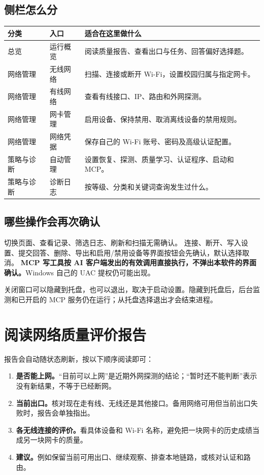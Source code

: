 \documentclass[UTF8,fontset=fandol,11pt,a4paper]{ctexart}
\begin{document}
\subsection{侧栏怎么分}
\begin{tabularx}{\linewidth}{@{}p{23mm}p{29mm}X@{}}
\toprule
分类 & 入口 & 适合在这里做什么\\
\midrule
总览 & 运行概览 & 阅读质量报告、查看出口与任务、回答偏好选择题。\\
网络管理 & 无线网络 & 扫描、连接或断开 Wi-Fi，设置校园归属与指定网卡。\\
网络管理 & 有线网络 & 查看有线接口、IP、路由和外网探测。\\
网络管理 & 网卡管理 & 启用设备、保持禁用、取消离线设备的禁用规则。\\
网络管理 & 网络凭据 & 保存自己的 Wi-Fi 账号、密码及高级认证配置。\\
策略与诊断 & 自动管理 & 设置恢复、探测、质量学习、认证程序、启动和 MCP。\\
策略与诊断 & 诊断日志 & 按等级、分类和关键词查询发生过什么。\\
\bottomrule
\end{tabularx}

\subsection{哪些操作会再次确认}
切换页面、查看记录、筛选日志、刷新和扫描无需确认。
连接、断开、写入设置、提交回答、删除、导出和启用/禁用设备等界面按钮会先确认，默认选择取消。
\textbf{MCP 写工具按 AI 客户端发出的有效调用直接执行，不弹出本软件的界面确认。}Windows 自己的 UAC 提权仍可能出现。

关闭窗口可以隐藏到托盘，也可以退出，取决于启动设置。隐藏到托盘后，后台监测和已开启的 MCP 服务仍在运行；从托盘选择退出才会结束进程。

\section{阅读网络质量评价报告}
报告会自动随状态刷新，按以下顺序阅读即可：
\begin{enumerate}
\item \textbf{是否能上网。}“目前可以上网”是近期外网探测的结论；“暂时还不能判断”表示没有新结果，不等于已经断网。
\item \textbf{当前出口。}核对现在走有线、无线还是其他接口。备用网络可用但当前出口失败时，报告会单独指出。
\item \textbf{各无线连接的评价。}看具体设备和 Wi-Fi 名称，避免把一块网卡的历史成绩当成另一块网卡的质量。
\item \textbf{建议。}例如保留当前可用出口、继续观察、排查本地链路，或核对认证和路由。
\end{enumerate}
\end{document}
